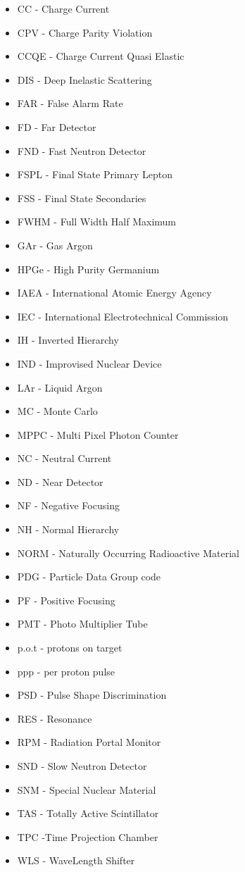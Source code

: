 \begin{glossary2} 

\begin{itemize}
	\item CC - Charge Current
	\item CPV - Charge Parity Violation
	\item CCQE - Charge Current Quasi Elastic
	\item DIS - Deep Inelastic Scattering
	\item FAR - False Alarm Rate
	\item FD - Far Detector
	\item FND - Fast Neutron Detector
	\item FSPL - Final State Primary Lepton
	\item FSS - Final State Secondaries
	\item FWHM - Full Width Half Maximum
	\item GAr - Gas Argon
	\item HPGe - High Purity Germanium
	\item IAEA - International Atomic Energy Agency
	\item IEC - International Electrotechnical Commission
	\item IH - Inverted Hierarchy
	\item IND - Improvised Nuclear Device
	\item LAr - Liquid Argon
	\item MC - Monte Carlo
	\item MPPC - Multi Pixel Photon Counter
	\item NC - Neutral Current
	\item ND - Near Detector
	\item NF - Negative Focusing
	\item NH - Normal Hierarchy
	\item NORM - Naturally Occurring Radioactive Material
	\item PDG - Particle Data Group code
	\item PF - Positive Focusing
	\item PMT - Photo Multiplier Tube
	\item p.o.t - protons on target
	\item ppp - per proton pulse
	\item PSD - Pulse Shape Discrimination
	\item RES - Resonance
	\item RPM - Radiation Portal Monitor
	\item SND - Slow Neutron Detector
	\item SNM - Special Nuclear Material
	\item TAS - Totally Active Scintillator
	\item TPC -Time Projection Chamber
	\item WLS - WaveLength Shifter
\end{itemize}

\end{glossary2}
